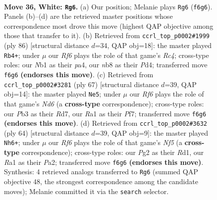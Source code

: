 \documentclass[11pt]{article}
\begin{document}
\clearpage

\begin{figure}[p]\centering
\begin{subfigure}{0.46\textwidth}\centering
\resizebox{\linewidth}{!}{%
\newchessgame
\chessboard[
  setfen={rnb5/4k3/5R2/3p4/1p6/pP2B3/P1P3PK/RN6 w - - 1 36},
  showmover=false,
  pgfstyle=straightmove, color=movearrow, markmove={f6-g6}
]}
\caption{}
\end{subfigure}\hfill
\begin{subfigure}{0.46\textwidth}\centering
\resizebox{\linewidth}{!}{%
\newchessgame
\chessboard[
  setfen={8/1k6/7p/r2p1ppP/p1RP4/4P3/1P1K1P2/8 w - - 0 44},
  showmover=false,
  pgfstyle=straightmove, color=movearrow, markmove={c4-b4}
]}
\caption{}
\end{subfigure}
\\[4pt]
\begin{subfigure}{0.46\textwidth}\centering
\resizebox{\linewidth}{!}{%
\newchessgame
\chessboard[
  setfen={8/3r1ppk/4p2p/N7/p3P3/3n2P1/1PR1KP1P/8 b - - 3 34},
  showmover=false,
  pgfstyle=straightmove, color=movearrow, markmove={d3-e5}
]}
\caption{}
\end{subfigure}\hfill
\begin{subfigure}{0.46\textwidth}\centering
\resizebox{\linewidth}{!}{%
\newchessgame
\chessboard[
  setfen={r5k1/p4p2/2p5/2PnrNpp/8/5R1P/P5P1/3R2K1 w - - 0 33},
  showmover=false,
  pgfstyle=straightmove, color=movearrow, markmove={f5-h6}
]}
\caption{}
\end{subfigure}
\caption{\textbf{Move 36, White: \texttt{Rg6}.} (a) Our position; Melanie plays \texttt{Rg6} (\texttt{f6g6}). Panels (b)--(d) are the retrieved master positions whose correspondence most drove this move (highest QAP objective among those that transfer to it). (b) Retrieved from \texttt{ccrl\_top\_p0002\#1999} (ply 86) [structural distance $d$=34, QAP obj=18]: the master played \texttt{Rb4+}; under $\mu$ our \emph{Rf6} plays the role of that game's \emph{Rc4}; cross-type roles: our \emph{N}b1 as their \emph{p}a4, our \emph{n}b8 as their \emph{P}d4; transferred move \texttt{f6g6} \textbf{(endorses this move)}. (c) Retrieved from \texttt{ccrl\_top\_p0002\#3281} (ply 67) [structural distance $d$=39, QAP obj=14]: the master played \texttt{Ne5}; under $\mu$ our \emph{Rf6} plays the role of that game's \emph{Nd6} (a \textbf{cross-type} correspondence); cross-type roles: our \emph{P}b3 as their \emph{R}d7, our \emph{R}a1 as their \emph{P}f7; transferred move \texttt{f6g6} \textbf{(endorses this move)}. (d) Retrieved from \texttt{ccrl\_top\_p0002\#3632} (ply 64) [structural distance $d$=39, QAP obj=9]: the master played \texttt{Nh6+}; under $\mu$ our \emph{Rf6} plays the role of that game's \emph{Nf5} (a \textbf{cross-type} correspondence); cross-type roles: our \emph{P}g2 as their \emph{R}d1, our \emph{R}a1 as their \emph{P}a2; transferred move \texttt{f6g6} \textbf{(endorses this move)}. Synthesis: 4 retrieved analogs transferred to \texttt{Rg6} (summed QAP objective 48, the strongest correspondence among the candidate moves); Melanie committed it via the \texttt{search} selector.}
\label{fig:thought-m70}
\end{figure}
\end{document}
